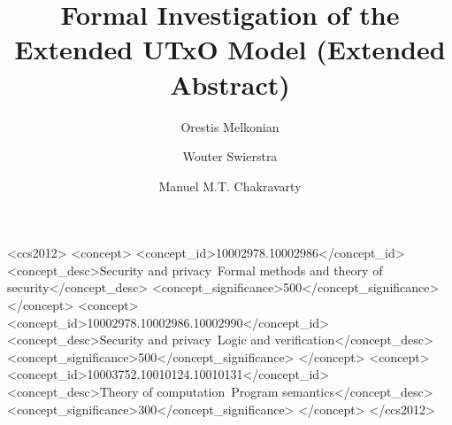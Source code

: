 \documentclass[sigplan,review,screen]{acmart}\settopmatter{printfolios=true,printccs=false,printacmref=false}
\begin{document}
\sloppy %

\title{Formal Investigation of the Extended UTxO Model (Extended Abstract)}

\author{Orestis Melkonian}

\author{Wouter Swierstra}

\author{Manuel M.T. Chakravarty}


\begin{CCSXML}
<ccs2012>
<concept>
<concept_id>10002978.10002986</concept_id>
<concept_desc>Security and privacy~Formal methods and theory of security</concept_desc>
<concept_significance>500</concept_significance>
</concept>
<concept>
<concept_id>10002978.10002986.10002990</concept_id>
<concept_desc>Security and privacy~Logic and verification</concept_desc>
<concept_significance>500</concept_significance>
</concept>
<concept>
<concept_id>10003752.10010124.10010131</concept_id>
<concept_desc>Theory of computation~Program semantics</concept_desc>
<concept_significance>300</concept_significance>
</concept>
</ccs2012>
\end{CCSXML}



\maketitle
\end{document}
